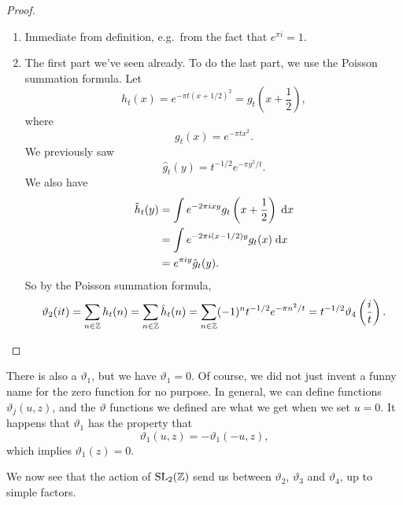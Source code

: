 \documentclass[a4paper]{article}
\begin{document}
\begin{proof}\leavevmode
  \begin{enumerate}
    \item Immediate from definition, e.g.\ from the fact that $e^{\pi i} = 1$.
    \item The first part we've seen already. To do the last part, we use the Poisson summation formula. Let
      \[
        h_t(x) = e^{-\pi t(x + 1/2)^2} = g_t\left(x + \frac{1}{2}\right),
      \]
      where
      \[
        g_t(x) = e^{-\pi tx^2}.
      \]
      We previously saw
      \[
        \hat{g}_t(y) = t^{-1/2} e^{-\pi y^2/t}.
      \]
      We also have
      \begin{align*}
        \hat{h}_t(y) &= \int e^{-2\pi i xy} g_t\left(x + \frac{1}{2}\right)\;\mathrm{d} x \\
        &= \int e^{-2\pi i (x - 1/2) y} g_t(x) \;\mathrm{d} x \\
        &= e^{\pi i y} \hat{g}_t(y).
      \end{align*}
      So by the Poisson summation formula,
      \[
        \vartheta_2(it) = \sum_{n \in \mathbb{Z}} h_t(n) = \sum_{n \in \mathbb{Z}} \hat{h}_t(n) = \sum_{n \in \mathbb{Z}} (-1)^n t^{-1/2} e^{-\pi n^2/t} = t^{-1/2} \vartheta_4 \left(\frac{i}{t}\right).\qedhere
      \]%
  \end{enumerate}
\end{proof}
There is also a $\vartheta_1$, but we have $\vartheta_1 = 0$. Of course, we did not just invent a funny name for the zero function for no purpose. In general, we can define functions $\vartheta_j(u, z)$, and the $\vartheta$ functions we defined are what we get when we set $u = 0$. It happens that $\vartheta_1$ has the property that
\[
  \vartheta_1(u, z) = - \vartheta_1(-u, z),
\]
which implies $\vartheta_1(z) = 0$.

We now see that the action of $\mathrm{SL}_2(\mathbb{Z})$ send us between $\vartheta_2$, $\vartheta_3$ and $\vartheta_4$, up to simple factors.
\end{document}
